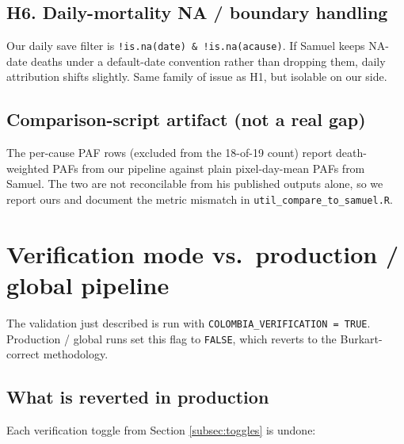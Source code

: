 \documentclass[11pt]{article}
\begin{document}
\subsection*{H6. Daily-mortality NA / boundary handling}

Our daily save filter is \texttt{!is.na(date) \& !is.na(acause)}. If Samuel
keeps NA-date deaths under a default-date convention rather than dropping
them, daily attribution shifts slightly. Same family of issue as H1, but
isolable on our side.

\subsection*{Comparison-script artifact (not a real gap)}

The per-cause PAF rows (excluded from the 18-of-19 count) report
death-weighted PAFs from our pipeline against plain pixel-day-mean PAFs from
Samuel. The two are not reconcilable from his published outputs alone, so
we report ours and document the metric mismatch in
\texttt{util\_compare\_to\_samuel.R}.

\section{Verification mode vs.\ production / global pipeline}
\label{sec:verif-vs-prod}

The validation just described is run with \texttt{COLOMBIA\_VERIFICATION = TRUE}.
Production / global runs set this flag to \texttt{FALSE}, which reverts to
the Burkart-correct methodology.

\subsection{What is reverted in production}

Each verification toggle from Section \ref{subsec:toggles} is undone:
\end{document}
